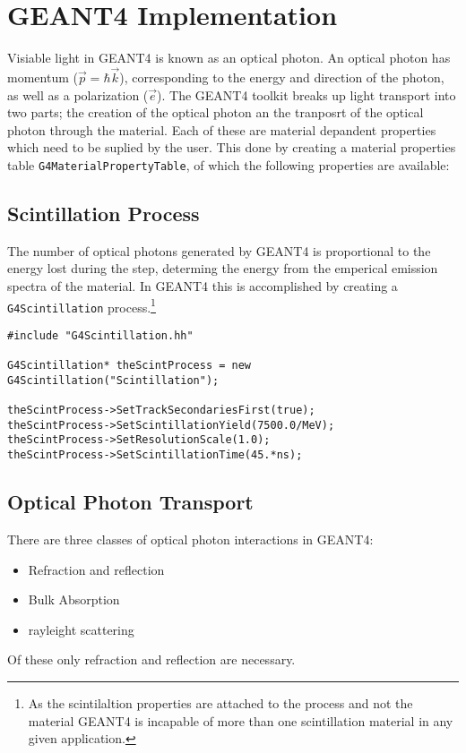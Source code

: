 
\section{GEANT4 Implementation}
Visiable light in GEANT4 is known as an optical photon.
An optical photon has momentum ($\vec{p} = \hbar \vec{k}$), corresponding to the energy and direction of the photon, as well as a polarization ($\vec{e}$).
The GEANT4 toolkit breaks up light transport into two parts; the creation of the optical photon an  the tranposrt of the optical photon through the material.
Each of these are material depandent properties which need to be suplied by the user.
This done by creating a material properties table \lstinline{G4MaterialPropertyTable}, of which the following properties are available:
\subsection{Scintillation Process}
The number of optical photons generated by GEANT4 is proportional to the energy lost during the step, determing the energy from the emperical emission spectra of the material.
In GEANT4 this is accomplished by creating a \lstinline{G4Scintillation} process.\footnote{As the scintilaltion properties are attached to the process and not the material GEANT4 is incapable of more than one scintillation material in any given application.}
\begin{lstlisting}
#include "G4Scintillation.hh"

G4Scintillation* theScintProcess = new G4Scintillation("Scintillation");

theScintProcess->SetTrackSecondariesFirst(true);
theScintProcess->SetScintillationYield(7500.0/MeV);
theScintProcess->SetResolutionScale(1.0);
theScintProcess->SetScintillationTime(45.*ns);
\end{lstlisting}

\subsection{Optical Photon Transport}
There are three classes of optical photon interactions in GEANT4:
\begin{itemize}
    \item Refraction and reflection
    \item Bulk Absorption
    \item rayleight scattering
\end{itemize}
Of these only refraction and reflection are necessary. \cite{cern_interactionsOfOpticalPhotons}

\cite{riggi}
